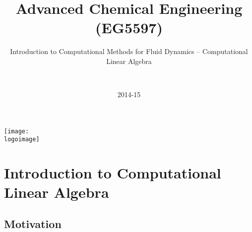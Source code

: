 \documentclass[10pt,compress,handout,ignorenonframetext]{beamer}
\institute{School of Engineering}
\title{Advanced Chemical Engineering (EG5597)}
\subtitle{Introduction to Computational Methods for Fluid Dynamics -- Computational Linear Algebra}
\date[2014-15]{2014-15}
\author[\shortname]{%
  \fullname\\\ttfamily{\emailaddress}
}
\newcommand{\logoimage}{./FigBanner/UoAHorizBanner}
\begin{document}
\begin{frame}
  \titlepage
  \vfill%
  \begin{center}
    \texttt{[image: \\logoimage]}
  \end{center}
\end{frame}






\section{Introduction to Computational Linear Algebra} 

\subsection{Motivation}
\end{document}
